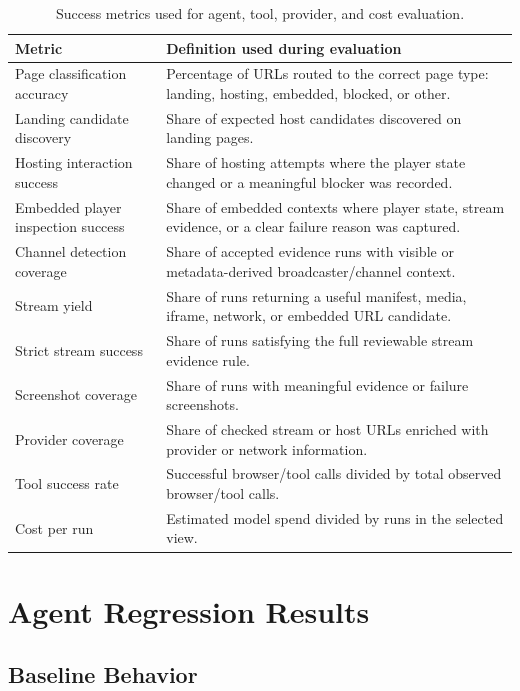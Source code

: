 \begin{table}[!htbp]
\centering
\begin{tabularx}{\textwidth}{Q{4.1cm}Y}
\toprule
{}
Metric & Definition used during evaluation \\
\midrule
Page classification accuracy & Percentage of URLs routed to the correct page
type: landing, hosting, embedded, blocked, or other. \\
Landing candidate discovery & Share of expected host candidates discovered on
landing pages. \\
Hosting interaction success & Share of hosting attempts where the player state
changed or a meaningful blocker was recorded. \\
Embedded player inspection success & Share of embedded contexts where player
state, stream evidence, or a clear failure reason was captured. \\
Channel detection coverage & Share of accepted evidence runs with visible or
metadata-derived broadcaster/channel context. \\
Stream yield & Share of runs returning a useful manifest, media, iframe,
network, or embedded URL candidate. \\
Strict stream success & Share of runs satisfying the full reviewable stream
evidence rule. \\
Screenshot coverage & Share of runs with meaningful evidence or failure
screenshots. \\
Provider coverage & Share of checked stream or host URLs enriched with
provider or network information. \\
Tool success rate & Successful browser/tool calls divided by total observed
browser/tool calls. \\
Cost per run & Estimated model spend divided by runs in the selected view. \\
\bottomrule
\end{tabularx}
\caption{Success metrics used for agent, tool, provider, and cost evaluation.}
\label{tab:evaluation-metrics}
\end{table}

\section{Agent Regression Results}

\subsection{Baseline Behavior}

